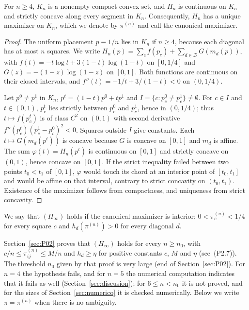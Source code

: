 \begin{lema}\label{lem:maximizador}
For $n\ge4$, $K_n$ is a nonempty compact convex set, and $H_n$ is continuous on $K_n$ and strictly concave
along every segment in $K_n$. Consequently, $H_n$ has a unique maximizer on $K_n$, which we
denote by $\pi^{(n)}$ and call the canonical maximizer.
\end{lema}
\begin{proof}
The uniform placement $p\equiv1/n$ lies in $K_n$ if $n\ge4$, because each diagonal has at most $n$
squares. We write $H_n(p)=\sum_cf(p_c)+\sum_{d\in\mathcal D}G(m_d(p))$, with
$f(t)=-t\log t+3(1-t)\log(1-t)$ on $[0,1/4]$ and $G(z)=-(1-z)\log(1-z)$ on $[0,1]$. Both functions are
continuous on
their closed intervals, and $f''(t)=-1/t+3/(1-t)<0$ on $(0,1/4)$.

Let $p^0\ne p^1$ in $K_n$, $p^t=(1-t)p^0+tp^1$ and $I=\{c:p^0_c\ne p^1_c\}\ne\emptyset$. For $c\in I$ and
$t\in(0,1)$, $p^t_c$ lies strictly between $p^0_c$ and $p^1_c$, hence in $(0,1/4)$; thus
$t\mapsto f(p^t_c)$ is of class $C^2$ on $(0,1)$ with second derivative $f''(p^t_c)(p^1_c-p^0_c)^2<0$.
Squares outside $I$ give constants. Each $t\mapsto G(m_d(p^t))$ is concave because $G$ is concave
on $[0,1]$ and $m_d$ is affine. The sum $\varphi(t)=H_n(p^t)$ is continuous on $[0,1]$ and strictly concave
on $(0,1)$, hence concave on $[0,1]$. If the strict inequality failed between two points
$t_0<t_1$ of $[0,1]$, $\varphi$ would touch its chord at an interior point of $[t_0,t_1]$ and would be
affine on
that interval, contrary to strict concavity on $(t_0,t_1)$. Existence of the maximizer follows
from compactness, and uniqueness from strict concavity.
\end{proof}

\begin{definicion}\label{def:Hinf}
We say that $(H_\infty)$ holds if the canonical maximizer is interior:
$0<\pi^{(n)}_c<1/4$ for every square $c$ and $h_d(\pi^{(n)})>0$ for every diagonal $d$.
\end{definicion}

Section~\ref{sec:P02} proves that $(H_\infty)$ holds for every $n\ge n_0$, with
$c/n\le\pi^{(n)}_{ij}\le M/n$ and $h_d\ge\eta$ for positive constants $c$, $M$ and $\eta$
(see~(P2.7)). The threshold $n_0$ given by that proof is very large (end of Section~\ref{sec:P02}).
For $n=4$ the hypothesis fails, and for $n=5$ the numerical computation indicates that it fails as well
(Section~\ref{sec:discusion}); for $6\le n<n_0$ it is not proved, and for the sizes of
Section~\ref{sec:numerico} it is checked numerically.
Below we write $\pi=\pi^{(n)}$ when there is no ambiguity.

